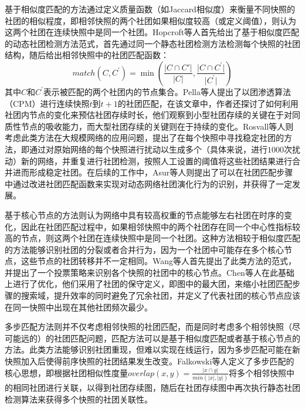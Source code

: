 基于相似度匹配的方法通过定义质量函数（如Jaccard相似度）来衡量不同快照的社团的相似程度，即相邻快照的两个社团如果相似度较高（或定义阈值），则认为这两个社团在连续快照中是同一个社团。Hopcroft等人\cite{hopcroft2004tracking}首先给出了基于相似度匹配的动态社团检测方法范式，首先通过同一个静态社团检测方法检测每个快照的社团结构，随后给出相邻快照中的社团匹配函数：
\begin{equation}
    match(C,C^{'})=\min(\frac{\lvert C \cap C{'} \rvert}{\lvert C \rvert},\frac{\lvert C \cap C^{'} \rvert}{\lvert C^{'} \rvert})
\end{equation}
其中$C$和$C^{'}$表示被匹配的两个社团内的节点集合。Pella等人\cite{palla2007quantifying}提出了以团渗透算法（CPM）进行连续快照$t$到$t+1$的社团匹配，在该文章中，作者还探讨了如何利用社团内节点的变化来预估社团存续时长，他们观察到小型社团存续的关键在于对同质性节点的吸收能力，而大型社团存续的关键则在于持续的变化。Rosvall等人\cite{rosvall2010mapping}则考虑此类方法在大规模网络的应用问题，提出了在每个快照中寻找稳定社团的方法，即通过对原始网络的每个快照进行扰动以生成多个（具体来说，进行$1000$次扰动）新的网络，并重复进行社团检测，按照人工设置的阈值将这些社团结果进行合并进而形成稳定社团。在后续的工作中，Asur等人\cite{asur2009event}则提出了可以在社团匹配步骤中通过改进社团匹配函数来实现对动态网络社团演化行为的识别，并获得了一定发展\cite{bota2011dynamic}。

基于核心节点的方法则认为网络中具有较高权重的节点能够左右社团在时序的变化，因此在社团匹配过程中，如果相邻快照中的两个社团存在同一个中心性指标较高的节点，则这两个社团在连续快照中是同一个社团。这种方法相较于相似度匹配的方法能够识别社团的分裂或者合并行为，因为一个社团中可能存在多个核心节点，这些节点的社团转移并不一定相同。Wang等人\cite{wang2008commtracker}首先提出了此类方法的范式，并提出了一个投票策略来识别各个快照的社团中的核心节点。Chen等人\cite{chen2010detecting}在此基础上进行了优化，他们采用了社团的保守定义，即图中的最大团，来缩小社团匹配步骤的搜索域，提升效率的同时避免了冗余社团，并定义了代表社团的核心节点应该在同一快照中出现在其他社团频次最少。

多步匹配方法则并不仅考虑相邻快照的社团匹配，而是同时考虑多个相邻快照（尽可能远的）的社团匹配问题，匹配方法可以是基于相似度匹配或者基于核心节点的方法。此类方法能够识别社团重现，但难以实现在线运行，因为多步匹配可能在新快照加入后使得前序快照的社团结果发生改变。Falkowski等人\cite{falkowski2006mining,falkowski2007data}定义了多步匹配的核心思想，即根据社团相似性度量$overlap(x,y)=\frac{\lvert x \cap y \rvert}{min(\lvert x \rvert,\lvert y \rvert)}$将多个相邻快照中的相同社团进行关联，以得到社团存续图，随后在社团存续图中再次执行静态社团检测算法来获得多个快照的社团关联性。

